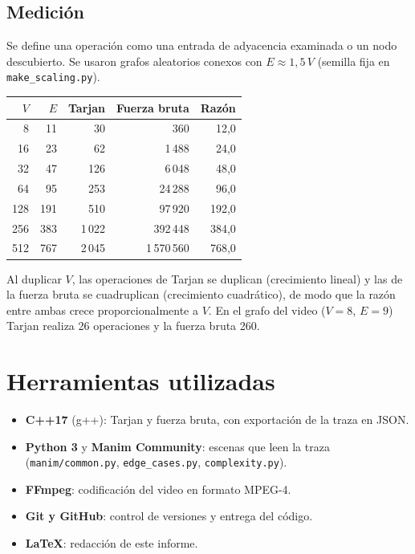 \documentclass[11pt,a4paper]{article}
\begin{document}
\subsection{Medición}
Se define una operación como una entrada de adyacencia examinada o un nodo descubierto. Se usaron
grafos aleatorios conexos con $E\approx 1{,}5\,V$ (semilla fija en \texttt{make\_scaling.py}).
\begin{center}
\begin{tabular}{rrrrr}
\toprule
$V$ & $E$ & Tarjan & Fuerza bruta & Razón\\
\midrule
8 & 11 & 30 & 360 & 12,0\\
16 & 23 & 62 & 1\,488 & 24,0\\
32 & 47 & 126 & 6\,048 & 48,0\\
64 & 95 & 253 & 24\,288 & 96,0\\
128 & 191 & 510 & 97\,920 & 192,0\\
256 & 383 & 1\,022 & 392\,448 & 384,0\\
512 & 767 & 2\,045 & 1\,570\,560 & 768,0\\
\bottomrule
\end{tabular}
\end{center}
Al duplicar $V$, las operaciones de Tarjan se duplican (crecimiento lineal) y las de la fuerza bruta se
cuadruplican (crecimiento cuadrático), de modo que la razón entre ambas crece proporcionalmente a $V$.
En el grafo del video ($V=8$, $E=9$) Tarjan realiza 26 operaciones y la fuerza bruta 260.

\section{Herramientas utilizadas}
\begin{itemize}
\item \textbf{C++17} (g++): Tarjan y fuerza bruta, con exportación de la traza en JSON.
\item \textbf{Python 3} y \textbf{Manim Community}: escenas que leen la traza (\texttt{manim/common.py},
\texttt{edge\_cases.py}, \texttt{complexity.py}).
\item \textbf{FFmpeg}: codificación del video en formato MPEG-4.
\item \textbf{Git y GitHub}: control de versiones y entrega del código.
\item \textbf{\LaTeX}: redacción de este informe.
\end{itemize}
\end{document}
